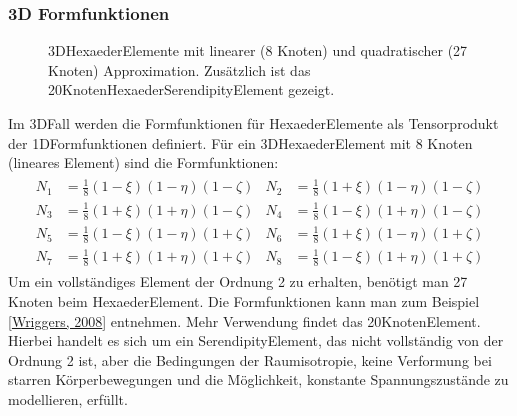 \documentclass[letterpaper,10pt,german]{jupyterBook}
\let\sphinxpxdimen\pdfpxdimen\else\newdimen\sphinxpxdimen
\begin{document}
\subsubsection{3D Formfunktionen}
\label{\detokenize{chapters/chapter3/Ansatzfunktionen:id4}}
\begin{figure}[htbp]
\centering
\capstart

\noindent\sphinxincludegraphics[width=500\sphinxpxdimen]{{HexElements}.png}
\caption{3D\sphinxhyphen{}Hexaeder\sphinxhyphen{}Elemente mit linearer (8 Knoten) und quadratischer (27 Knoten) Approximation. Zusätzlich ist das 20\sphinxhyphen{}Knoten\sphinxhyphen{}Hexaeder\sphinxhyphen{}Serendipity\sphinxhyphen{}Element gezeigt.}\label{\detokenize{chapters/chapter3/Ansatzfunktionen:hexelements}}\end{figure}

\sphinxAtStartPar
Im 3D\sphinxhyphen{}Fall werden die Formfunktionen für Hexaeder\sphinxhyphen{}Elemente als Tensorprodukt der 1D\sphinxhyphen{}Formfunktionen definiert. Für ein 3D\sphinxhyphen{}Hexaeder\sphinxhyphen{}Element mit 8 Knoten (lineares Element) sind die Formfunktionen:
\begin{equation}\label{equation:chapters/chapter3/Ansatzfunktionen:3D_ShapeFunctions_H8}
\begin{split}\begin{align}
N_1 &= \frac{1}{8} (1 - \xi)(1 - \eta)(1 - \zeta) & N_2 &= \frac{1}{8} (1 + \xi)(1 - \eta)(1 - \zeta) \\
N_3 &= \frac{1}{8} (1 + \xi)(1 + \eta)(1 - \zeta) & N_4 &= \frac{1}{8} (1 - \xi)(1 + \eta)(1 - \zeta) \\
N_5 &= \frac{1}{8} (1 - \xi)(1 - \eta)(1 + \zeta) & N_6 &= \frac{1}{8} (1 + \xi)(1 - \eta)(1 + \zeta) \\
N_7 &= \frac{1}{8} (1 + \xi)(1 + \eta)(1 + \zeta) & N_8 &= \frac{1}{8} (1 - \xi)(1 + \eta)(1 + \zeta)
\end{align}\end{split}
\end{equation}
\sphinxAtStartPar
Um ein vollständiges Element der Ordnung 2 zu erhalten, benötigt man 27 Knoten beim Hexaeder\sphinxhyphen{}Element. Die Formfunktionen kann man zum Beispiel {[}\hyperlink{cite.quellen:id9}{Wriggers, 2008}{]} entnehmen. Mehr Verwendung findet das 20\sphinxhyphen{}Knoten\sphinxhyphen{}Element. Hierbei handelt es sich um ein Serendipity\sphinxhyphen{}Element, das nicht vollständig von der Ordnung 2 ist, aber die Bedingungen der Raumisotropie, keine Verformung bei starren Körperbewegungen und die Möglichkeit, konstante Spannungszustände zu modellieren, erfüllt.
\end{document}
